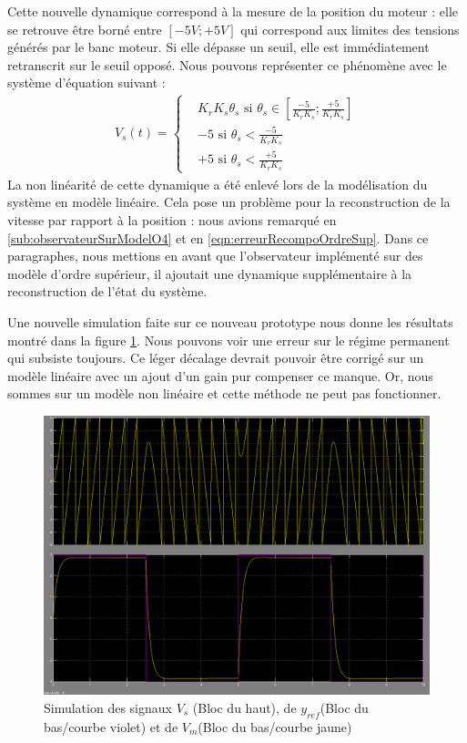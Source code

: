 		Cette nouvelle dynamique correspond à la mesure de la position du moteur : elle se retrouve être borné entre $[-5V; +5V]$ qui correspond aux limites des tensions générés par le banc moteur. Si elle dépasse un seuil, elle est immédiatement retranscrit sur le seuil opposé. Nous pouvons représenter ce phénomène avec le système d'équation suivant :
		\begin{align*}
		V_s(t) = \left\lbrace \begin{aligned}
		&K_rK_s\theta_s \text{ si } \theta_s \in \left[\frac{-5}{K_rK_s}; \frac{+5}{K_rK_s}\right]\\
		&-5 \text{ si } \theta_s < \frac{-5}{K_rK_s}\\
		&+5 \text{ si } \theta_s < \frac{+5}{K_rK_s}
		\end{aligned}
		\right.		
		\end{align*}
		La non linéarité de cette dynamique a été enlevé lors de la modélisation du système en modèle linéaire. Cela pose un problème pour la reconstruction de la vitesse par rapport à la position : nous avions remarqué en \ref{sub:observateurSurModelO4} et en \ref{eqn:erreurRecompoOrdreSup}. Dans ce paragraphes, nous mettions en avant que l'observateur implémenté sur des modèle d'ordre supérieur, il ajoutait une dynamique supplémentaire à la reconstruction de l'état du système. 
		
				
			
		Une nouvelle simulation faite sur ce nouveau prototype nous donne les résultats montré dans la figure \ref{fig:SimuNL_ref_sortieVS_VM}. Nous pouvons voir une erreur sur le régime permanent qui subsiste toujours. Ce léger décalage devrait pouvoir être corrigé sur un modèle linéaire avec un ajout d'un gain pur compenser ce manque. Or, nous sommes sur un modèle non linéaire et cette méthode ne peut pas fonctionner. 
		\begin{figure}
		\centering
		\includegraphics[width= .8\textwidth]{./IV/images/NL_Position--ref_sortie_RE.PNG}
		\caption{Simulation des signaux $V_s$ (Bloc du haut), de $y_{ref}$(Bloc du bas/courbe violet) et de $V_m$(Bloc du bas/courbe jaune)\label{fig:SimuNL_ref_sortieVS_VM} }
		\end{figure}
		
